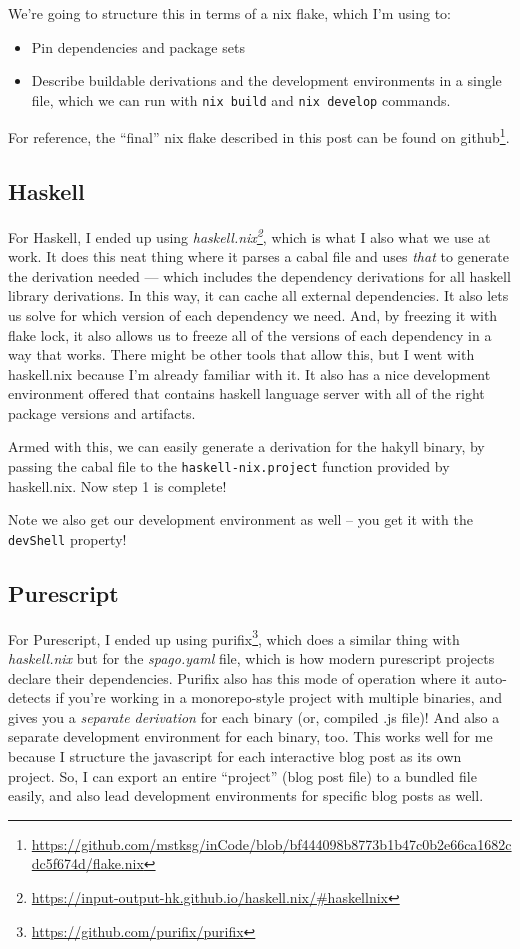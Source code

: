 \documentclass[]{article}
\renewcommand{\href}[2]{#2\footnote{\url{#1}}}
\begin{document}
We're going to structure this in terms of a nix flake, which I'm using to:

\begin{itemize}
\tightlist
\item
  Pin dependencies and package sets
\item
  Describe buildable derivations and the development environments in a single
  file, which we can run with \texttt{nix\ build} and \texttt{nix\ develop}
  commands.
\end{itemize}

For reference, the ``final'' nix flake described in this post
\href{https://github.com/mstksg/inCode/blob/bf444098b8773b1b47c0b2e66ca1682cdc5f674d/flake.nix}{can
be found on github}.

\subsection{Haskell}\label{haskell}

For Haskell, I ended up using
\emph{\href{https://input-output-hk.github.io/haskell.nix/\#haskellnix}{haskell.nix}},
which is what I also what we use at work. It does this neat thing where it
parses a cabal file and uses \emph{that} to generate the derivation needed ---
which includes the dependency derivations for all haskell library derivations.
In this way, it can cache all external dependencies. It also lets us solve for
which version of each dependency we need. And, by freezing it with flake lock,
it also allows us to freeze all of the versions of each dependency in a way that
works. There might be other tools that allow this, but I went with haskell.nix
because I'm already familiar with it. It also has a nice development environment
offered that contains haskell language server with all of the right package
versions and artifacts.

Armed with this, we can easily generate a derivation for the hakyll binary, by
passing the cabal file to the \texttt{haskell-nix.project\textquotesingle{}}
function provided by haskell.nix. Now step 1 is complete!

Note we also get our development environment as well -- you get it with the
\texttt{devShell} property!

\subsection{Purescript}\label{purescript}

For Purescript, I ended up using
\href{https://github.com/purifix/purifix}{purifix}, which does a similar thing
with \emph{haskell.nix} but for the \emph{spago.yaml} file, which is how modern
purescript projects declare their dependencies. Purifix also has this mode of
operation where it auto-detects if you're working in a monorepo-style project
with multiple binaries, and gives you a \emph{separate derivation} for each
binary (or, compiled .js file)! And also a separate development environment for
each binary, too. This works well for me because I structure the javascript for
each interactive blog post as its own project. So, I can export an entire
``project'' (blog post file) to a bundled file easily, and also lead development
environments for specific blog posts as well.
\end{document}
